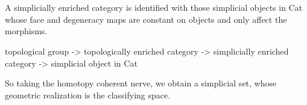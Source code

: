 \documentclass{../../large}
\begin{document}
\title{}
\author{Ikhan Choi}
\maketitle
\tableofcontents

\part{}
\chapter{}





\begin{prb}
A simplicially enriched category is identified with those simplicial objects in Cat whose face and degeneracy maps are constant on objects and only affect the morphisms.





topological group
-> topologically enriched category
-> simplicially enriched category
-> simplicial object in Cat

So taking the homotopy coherent nerve, we obtain a simplicial set, whose geometric realization is the classifying space.
\end{prb}
\end{document}
